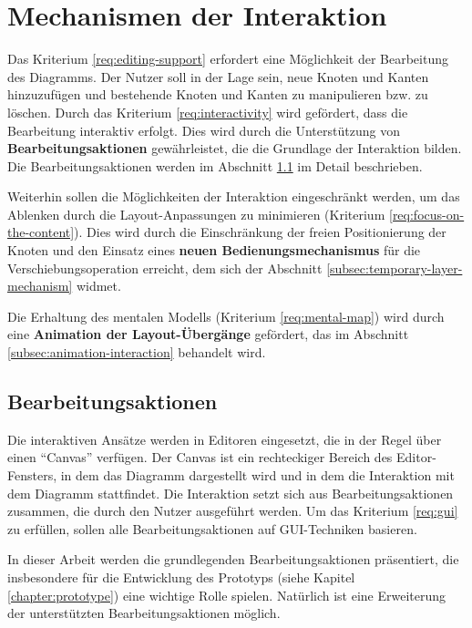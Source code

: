 \section{Mechanismen der Interaktion}
\label{sec:interaction-mechanisms}

Das Kriterium \ref{req:editing-support} erfordert eine Möglichkeit der Bearbeitung des Diagramms. Der Nutzer soll in der Lage sein, neue Knoten und Kanten hinzuzufügen und bestehende Knoten und Kanten zu manipulieren bzw. zu löschen. Durch das Kriterium \ref{req:interactivity} wird gefördert, dass die Bearbeitung interaktiv erfolgt. Dies wird durch die Unterstützung von \textbf{Bearbeitungsaktionen} gewährleistet, die die Grundlage der Interaktion bilden. Die Bearbeitungsaktionen werden im Abschnitt \ref{subsec:edit-actions} im Detail beschrieben.

Weiterhin sollen die Möglichkeiten der Interaktion eingeschränkt werden, um das Ablenken durch die Layout-Anpassungen zu minimieren (Kriterium \ref{req:focus-on-the-content}). Dies wird durch die Einschränkung der freien Positionierung der Knoten und den Einsatz eines \textbf{neuen Bedienungsmechanismus} für die Verschiebungsoperation erreicht, dem sich der Abschnitt \ref{subsec:temporary-layer-mechanism} widmet.

Die Erhaltung des mentalen Modells (Kriterium \ref{req:mental-map}) wird durch eine \textbf{Animation der Layout-Übergänge} gefördert, das im Abschnitt \ref{subsec:animation-interaction} behandelt wird.


\subsection{Bearbeitungsaktionen}
\label{subsec:edit-actions}

Die interaktiven Ansätze werden in Editoren eingesetzt, die in der Regel über einen \enquote{Canvas} verfügen. Der Canvas ist ein rechteckiger Bereich des Editor-Fensters, in dem das Diagramm dargestellt wird und in dem die Interaktion mit dem Diagramm stattfindet. Die Interaktion setzt sich aus Bearbeitungsaktionen zusammen, die durch den Nutzer ausgeführt werden. Um das Kriterium \ref{req:gui} zu erfüllen, sollen alle Bearbeitungsaktionen auf GUI-Techniken basieren.

In dieser Arbeit werden die grundlegenden Bearbeitungsaktionen präsentiert, die insbesondere für die Entwicklung des Prototyps (siehe Kapitel \ref{chapter:prototype}) eine wichtige Rolle spielen. Natürlich ist eine Erweiterung der unterstützten Bearbeitungsaktionen möglich.

